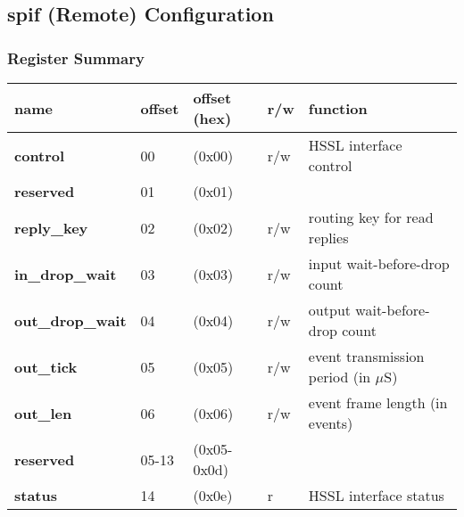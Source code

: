 \documentclass[11pt,a4paper,twoside]{article}
\begin{document}
\clearpage
\subsection{spif (Remote) Configuration}


\subsubsection*{Register Summary}

\begin{center}
\begin{table}[!h]
	\begin{tabularx}{\textwidth}{| p{37mm} p{13mm} p{21mm} p{6mm} X |}
		\hline
		\textbf{name}                        & \textbf{offset}            & \textbf{offset} (hex)          & \textbf{r/w}        & \textbf{function} \\%
		\hline
		\hline
		\textbf{control}                     & 00                         & (0x00)                         & r/w                 & HSSL interface control \\%
		\cellcolor{gray!25}\textbf{reserved} & \cellcolor{gray!25}01      & \cellcolor{gray!25}(0x01) & \cellcolor{gray!25} & \cellcolor{gray!25}\\%
		\textbf{reply\_key}                  & 02                         & (0x02)                         & r/w                 & routing key for read replies \\%
		\textbf{in\_drop\_wait}              & 03                         & (0x03)                         & r/w                 & input wait-before-drop count \\%
		\textbf{out\_drop\_wait}             & 04                         & (0x04)                         & r/w                 & output wait-before-drop count \\%
		\textbf{out\_tick}                   & 05                         & (0x05)                         & r/w                 & event transmission period (in $\mu$S)\\%
		\textbf{out\_len}                    & 06                         & (0x06)                         & r/w                 & event frame length (in events) \\%
		\cellcolor{gray!25}\textbf{reserved} & \cellcolor{gray!25}05-13   & \cellcolor{gray!25}(0x05-0x0d) & \cellcolor{gray!25} & \cellcolor{gray!25}\\%
		\textbf{status}                      & 14                         & (0x0e)                         & r                   & HSSL interface status \\%

\end{tabularx}
\end{table}
\end{center}
\end{document}
